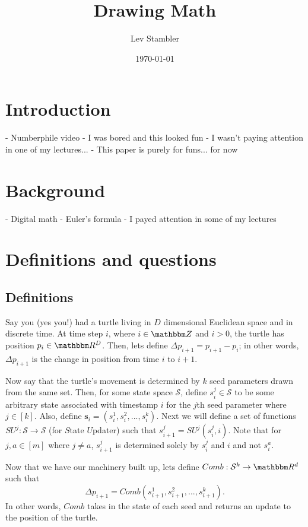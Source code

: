 \documentclass[11pt,titlepage]{article}
\newcommand{\myname}{Lev Stambler}
\newcommand{\combWithState}[1]{Comb\left(s^1_{#1}, s^2_{#1}, ..., s^k_{#1}\right)}
\begin{document}
\title{Drawing Math}

\author{\myname}

\date{\today}

\maketitle

\pagebreak
\section{Introduction}
- Numberphile video
- I was bored and this looked fun
- I wasn't paying attention in one of my lectures...
- This paper is purely for funs... for now

\section{Background}
- Digital math
- Euler's formula
- I payed attention in some of my lectures

\section{Definitions and questions}
\subsection{Definitions}
Say you (yes you!) had a turtle living in $D$ dimensional Euclidean
space and in discrete time. At time step $i$, where $i \in \Z$ and $i > 0$,
the turtle has position $p_i \in \R^D$.
Then, lets define $\Delta p_{i+1} = p_{i+1} - p_i$; in other words, $\Delta p_{i+1}$ is the change in position from time $i$ to $i + 1$.

Now say that the turtle's movement is determined by $k$ seed parameters drawn from
the same set. Then, for some state space $\mathcal{S}$,
define $s_i^j \in \mathcal{S}$ to be some arbitrary
state associated with timestamp $i$ for the $j$th seed parameter where $j \in [k]$.
Also, define $\pmb{s}_i = (s_i^1, s_i^2, ..., s_i^k)$.
Next we will define a set of functions $SU^j: \mathcal{S} \rightarrow \mathcal{S}$
(for $S$tate $U$pdater) such that $s_{i + 1}^j = SU^j(s_i^j, i)$. Note that for
$j, a \in [m]$ where $j \neq a$, $s_{i+1}^j$ is determined solely by $s_i^j$ and $i$ and not
$s_i^a$.

Now that we have our machinery built up, lets define $Comb: \mathcal{S}^k \rightarrow \R^d$ such that
$$
  \Delta p_{i + 1} = \combWithState{i + 1}.
$$
In other words, $Comb$ takes in the state of each seed and
returns an update to the position of the turtle.
\end{document}
